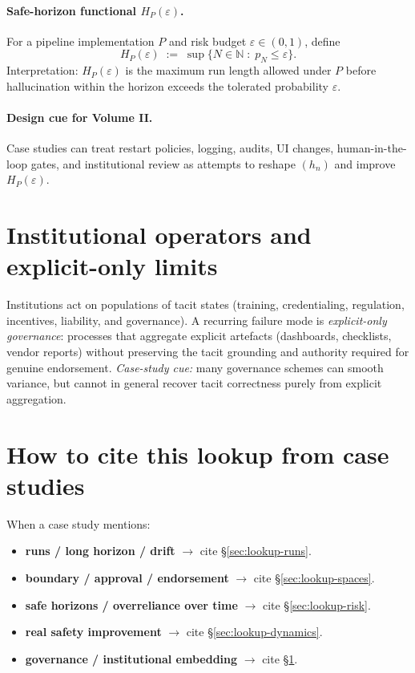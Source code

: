 \paragraph{Safe-horizon functional $H_{P}(\varepsilon)$.}
For a pipeline implementation $P$ and risk budget $\varepsilon \in (0,1)$, define
\[
H_{P}(\varepsilon)
\;:=\;
\sup\{N \in \mathbb{N} \;:\; p_N \le \varepsilon\}.
\]
Interpretation: $H_{P}(\varepsilon)$ is the maximum run length allowed under $P$ before hallucination
within the horizon exceeds the tolerated probability $\varepsilon$.

\paragraph{Design cue for Volume II.}
Case studies can treat restart policies, logging, audits, UI changes, human-in-the-loop gates,
and institutional review as attempts to reshape $(h_n)$ and improve $H_{P}(\varepsilon)$.

\section{Institutional operators and explicit-only limits}
\label{sec:lookup-institutions}

Institutions act on populations of tacit states (training, credentialing, regulation, incentives,
liability, and governance). A recurring failure mode is \emph{explicit-only governance}:
processes that aggregate explicit artefacts (dashboards, checklists, vendor reports) without preserving
the tacit grounding and authority required for genuine endorsement.
\emph{Case-study cue:} many governance schemes can smooth variance, but cannot in general recover tacit
correctness purely from explicit aggregation.

\section{How to cite this lookup from case studies}
\label{sec:lookup-cite}

When a case study mentions:
\begin{itemize}
\item \textbf{runs / long horizon / drift} $\to$ cite \S\ref{sec:lookup-runs}.
\item \textbf{boundary / approval / endorsement} $\to$ cite \S\ref{sec:lookup-spaces}.
\item \textbf{safe horizons / overreliance over time} $\to$ cite \S\ref{sec:lookup-risk}.
\item \textbf{real safety improvement} $\to$ cite \S\ref{sec:lookup-dynamics}.
\item \textbf{governance / institutional embedding} $\to$ cite \S\ref{sec:lookup-institutions}.
\end{itemize}



